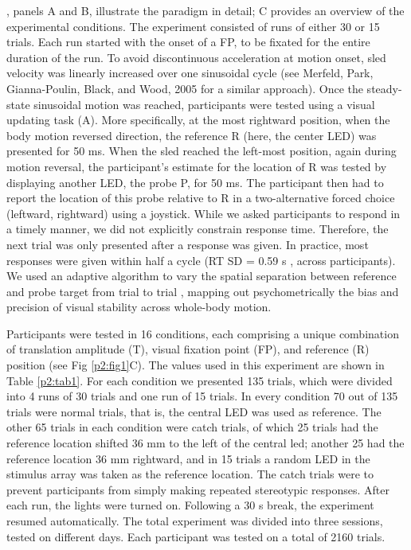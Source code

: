, panels A and B, illustrate the paradigm in detail; C provides an overview of the experimental conditions. The experiment consisted of runs of either 30 or 15 trials. Each run started with the onset of a FP, to be fixated for the entire duration of the run. To avoid discontinuous acceleration at motion onset, sled velocity was linearly increased over one sinusoidal cycle (see Merfeld, Park, Gianna-Poulin, Black, and Wood, 2005 for a similar approach). Once the steady-state sinusoidal motion was reached, participants were tested using a visual updating task (A). More specifically, at the most rightward position, when the body motion reversed direction, the reference R (here, the center LED) was presented for 50 \si{\milli\second}. When the sled reached the left-most position, again during motion reversal, the participant's estimate for the location of R was tested by displaying another LED, the probe P, for 50 \si{\milli\second}. The participant then had to report the location of this probe relative to R in a two-alternative forced choice (leftward, rightward) using a joystick. While we asked participants to respond in a timely manner, we did not explicitly constrain response time. Therefore, the next trial was only presented after a response was given. In practice, most responses were given within half a cycle (RT {\textpm}SD = 0.59 \si{\second} , across participants). We used an adaptive algorithm to vary the spatial separation between reference and probe target from trial to trial \cite{kontsevich1999}, mapping out psychometrically the bias and precision of visual stability across whole-body motion. 

Participants were tested in 16 conditions, each comprising a unique combination of translation amplitude (T), visual fixation point (FP), and reference (R) position (see Fig \ref{p2:fig1}C). The values used in this experiment are shown in Table \ref{p2:tab1}. For each condition we presented 135 trials, which were divided into 4 runs of 30 trials and one run of 15 trials. In every condition 70 out of 135 trials were normal trials, that is, the central LED was used as reference. The other 65 trials in each condition were catch trials, of which 25 trials had the reference location shifted 36 mm to the left of the central led; another 25 had the reference location 36 \si{\milli\metre} rightward, and in 15 trials a random LED in the stimulus array was taken as the reference location. The catch trials were to prevent participants from simply making repeated stereotypic responses. After each run, the lights were turned on. Following a 30 s break, the experiment resumed automatically. The total experiment was divided into three sessions, tested on different days.  Each participant was tested on a total of 2160 trials.

